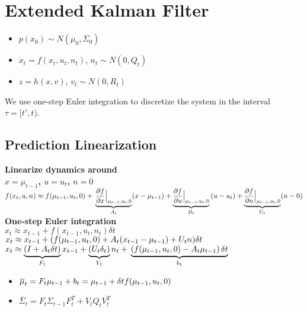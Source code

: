\section{Extended Kalman Filter}
\begin{itemize}
  \item $p(x_0) \sim N(\mu_0, \Sigma_0)$
  \item $\dot{x}_t = f(x_t, u_t, n_t)$, $n_t\sim N(0, Q_t)$
  \item $z = h(x, v)$, $v_t \sim N(0, R_t)$
\end{itemize}

We use one-step Euler integration to discretize the system in the
interval $\tau = [t', t)$.

\subsection*{Prediction Linearization}
\textbf{Linearize dynamics around\\$x = \mu_{t-1}$, $u = u_t$, $n = 0$}\\
$f(x_t, u, n) \approx f(\mu_{t-1}, u_t, 0) +\\
\underbrace{\dfrac{\partial f}{\partial x}\Bigr|_{\substack{\mu_{t-1},
u_t, 0}}}_{A_t}(x - \mu_{t-1}) + \underbrace{\dfrac{\partial f}{\partial
u}\Bigr|_{\substack{\mu_{t-1},
u_t, 0}}}_{B_t}\\(u - u_t) +
\underbrace{\dfrac{\partial f}{\partial n}\Bigr|_{\substack{\mu_{t-1},
u_t, 0}}}_{U_t}(n - 0)
$\\

\textbf{One-step Euler integration}\\
$x_t \approx x_{t-1} + f(x_{t-1}, u_t, n_t) \delta t$\\
$x_t \approx x_{t-1} + (  f(\mu_{t-1}, u_t, 0) + \\
A_t (x_{t-1} - \mu_{t-1})  +  U_t n) \delta t$\\
$x_t \approx \underbrace{(I + A_t \delta t)}_{F_t} x_{t-1}
+ \underbrace{(U_t \delta_t)}_{V_t} n_t + \\
\underbrace{\left( f(\mu_{t-1}, u_t, 0) - A_t \mu_{t-1}\right) \delta t}_{b_t}$
\begin{itemize}
  \item $\bar{\mu}_t = F_t \mu_{t-1} + b_t \\
    = \mu_{t-1} + \delta t f(\mu_{t-1}, u_t, 0)$
  \item $\bar{\Sigma}_t = F_t \Sigma_{t-1} F_t^T + V_t Q_t
    V_t^T$
\end{itemize}

